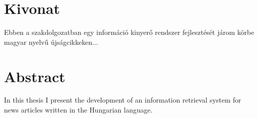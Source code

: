 \chapter*{Kivonat}

Ebben a szakdolgozatban egy információ kinyerő rendszer fejlesztését járom körbe magyar nyelvű újságcikkeken... 

\vfill

\chapter*{Abstract}

In this thesis I present the development of an information retrieval system for news articles written in the Hungarian language.

\vfill

